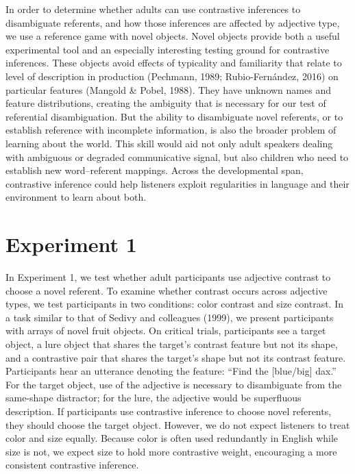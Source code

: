 \documentclass[10pt, letterpaper]{article}
\begin{document}
In order to determine whether adults can use contrastive inferences to
disambiguate referents, and how those inferences are affected by
adjective type, we use a reference game with novel objects. Novel
objects provide both a useful experimental tool and an especially
interesting testing ground for contrastive inferences. These objects
avoid effects of typicality and familiarity that relate to level of
description in production (Pechmann, 1989; Rubio-Fernández, 2016) on
particular features (Mangold \& Pobel, 1988). They have unknown names
and feature distributions, creating the ambiguity that is necessary for
our test of referential disambiguation. But the ability to disambiguate
novel referents, or to establish reference with incomplete information,
is also the broader problem of learning about the world. This skill
would aid not only adult speakers dealing with ambiguous or degraded
communicative signal, but also children who need to establish new
word--referent mappings. Across the developmental span, contrastive
inference could help listeners exploit regularities in language and
their environment to learn about both.

\hypertarget{experiment-1}{%
\section{Experiment 1}\label{experiment-1}}

In Experiment 1, we test whether adult participants use adjective
contrast to choose a novel referent. To examine whether contrast occurs
across adjective types, we test participants in two conditions: color
contrast and size contrast. In a task similar to that of Sedivy and
colleagues (1999), we present participants with arrays of novel fruit
objects. On critical trials, participants see a target object, a lure
object that shares the target's contrast feature but not its shape, and
a contrastive pair that shares the target's shape but not its contrast
feature. Participants hear an utterance denoting the feature: ``Find the
{[}blue/big{]} dax.'' For the target object, use of the adjective is
necessary to disambiguate from the same-shape distractor; for the lure,
the adjective would be superfluous description. If participants use
contrastive inference to choose novel referents, they should choose the
target object. However, we do not expect listeners to treat color and
size equally. Because color is often used redundantly in English while
size is not, we expect size to hold more contrastive weight, encouraging
a more consistent contrastive inference.
\end{document}
